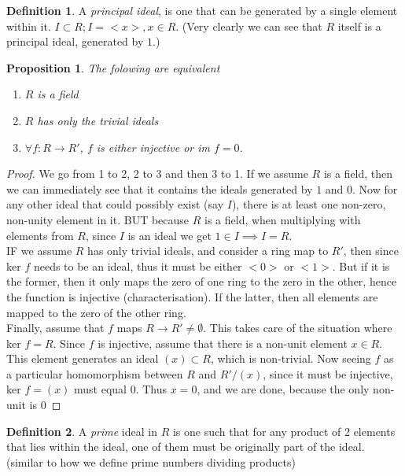 \documentclass[12pt]{book}
\newtheorem{proposition}{Proposition}[section]
\theoremstyle{definition}
\newtheorem*{definition}{Definition}
\begin{document}
\begin{definition}
    A \textit{principal ideal}, is one that can be generated by a single element within it. $I \subset R; I = <x>, x \in R$. (Very clearly we can see that $R$ itself is a principal ideal, generated by $1$.)
\end{definition}
\begin{proposition}
    The folowing are equivalent \begin{enumerate}
        \item $R$ is a field
        \item $R$ has only the trivial ideals
        \item $\forall f: R \to R'$, $f$ is either injective or im $f = 0$.
    \end{enumerate}
\end{proposition}
\begin{proof}
    We go from 1 to 2, 2 to 3 and then 3 to 1.
    If we assume $R$ is a field, then we can immediately see that it contains the ideals generated by $1$ and $0$. Now for any other ideal that could possibly exist (say $I$), there is at least one non-zero, non-unity element in it. BUT because $R$ is a field, when multiplying with elements from $R$, since $I$ is an ideal we get $1 \in I \implies I = R$.\\
    IF we assume $R$ has only trivial ideals, and consider a ring map to $R'$, then since ker $f$ needs to be an ideal, thus it must be either $<0>$ or $<1>$. But if it is the former, then it only maps the zero of one ring to the zero in the other, hence the function is injective (characterisation). If the latter, then all elements are mapped to the zero of the other ring.\\
    Finally, assume that $f$ maps $R \to R' \neq \emptyset$. This takes care of the situation where ker $f = R$. Since $f$ is injective, assume that there is a non-unit element $x \in R$. This element generates an ideal $(x) \subset R$, which is non-trivial. Now seeing $f$ as a particular homomorphism between $R$ and $R'/(x)$, since it must be injective, ker $f = (x)$ must equal ${0}$. Thus $x = 0$, and we are done, because the only non-unit is $0$
\end{proof}
\begin{definition}
    A \textit{prime} ideal in $R$ is one such that for any product of 2 elements that lies within the ideal, one of them must be originally part of the ideal. (similar to how we define prime numbers dividing products)
\end{definition}
\end{document}
